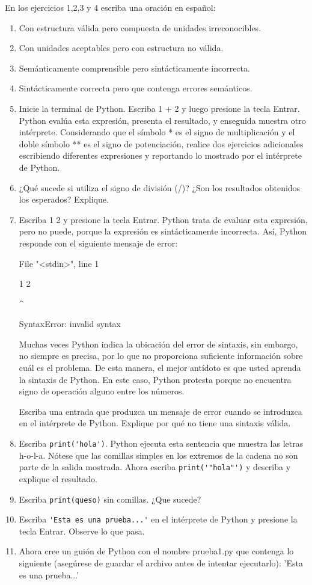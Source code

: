 En los ejercicios 1,2,3 y 4 escriba una oración en español:\\
\begin{enumerate}
\item Con estructura válida pero compuesta de unidades irreconocibles.
\item Con unidades aceptables pero con estructura no válida.
\item Semánticamente comprensible pero sintácticamente incorrecta.
\item Sintácticamente correcta pero que contenga errores semánticos.
\item Inicie la terminal de Python. Escriba 1 + 2 y luego presione la tecla
Entrar. Python evalúa esta expresión, presenta el resultado, y enseguida
muestra otro intérprete. Considerando que el símbolo {*} es el signo
de multiplicación y el doble símbolo {*}{*} es el signo de potenciación,
realice dos ejercicios adicionales escribiendo diferentes expresiones
y reportando lo mostrado por el intérprete de Python.
\item ¿Qué sucede si utiliza el signo de división (/)? ¿Son los resultados
obtenidos los esperados? Explique.
\item Escriba 1 2 y presione la tecla Entrar. Python trata de evaluar esta
expresión, pero no puede, porque la expresión es sintácticamente incorrecta.
Así, Python responde con el siguiente mensaje de error:

\begin{pyconcode}
 File "<stdin>", line 1

    1 2

      ^

SyntaxError: invalid syntax
\end{pyconcode}
Muchas veces Python indica la ubicación del error de sintaxis, sin
embargo, no siempre es precisa, por lo que no proporciona suficiente
información sobre cuál es el problema. De esta manera, el mejor antídoto
es que usted aprenda la sintaxis de Python. En este caso, Python protesta
porque no encuentra signo de operación alguno entre los números.

Escriba una entrada que produzca un mensaje de error cuando se introduzca
en el intérprete de Python. Explique por qué no tiene una sintaxis
válida.
\item Escriba \verb+print('hola')+. Python ejecuta esta sentencia que muestra
las letras h-o-l-a. Nótese que las comillas simples en los extremos
de la cadena no son parte de la salida mostrada. Ahora escriba \verb+print('"hola"')+
y describa y explique el resultado.
\item Escriba \verb+print(queso)+ sin comillas. ¿Que sucede?
\item Escriba \verb+'Esta es una prueba...'+ en el intérprete de Python
y presione la tecla Entrar. Observe lo que pasa.
\item Ahora cree un guión de Python con el nombre prueba1.py que contenga
lo siguiente (asegúrese de guardar el archivo antes de intentar ejecutarlo):
'Esta es una prueba...'


\end{enumerate}
